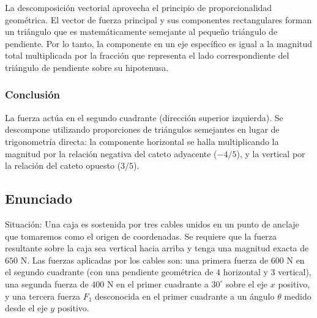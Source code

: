 \documentclass[12pt, a4paper]{article}
\begin{document}
La descomposición vectorial aprovecha el principio de proporcionalidad geométrica. El vector de fuerza principal y sus componentes rectangulares forman un triángulo que es matemáticamente semejante al pequeño triángulo de pendiente. Por lo tanto, la componente en un eje específico es igual a la magnitud total multiplicada por la fracción que representa el lado correspondiente del triángulo de pendiente sobre su hipotenusa.

\subsubsection*{Conclusión}
La fuerza actúa en el segundo cuadrante (dirección superior izquierda). Se descompone utilizando proporciones de triángulos semejantes en lugar de trigonometría directa: la componente horizontal se halla multiplicando la magnitud por la relación negativa del cateto adyacente ($-4/5$), y la vertical por la relación del cateto opuesto ($3/5$).

\newpage
\subsection*{Enunciado}
Situación: Una caja es sostenida por tres cables unidos en un punto de anclaje que tomaremos como el origen de coordenadas. Se requiere que la fuerza resultante sobre la caja sea vertical hacia arriba y tenga una magnitud exacta de $650 \text{ N}$. Las fuerzas aplicadas por los cables son: una primera fuerza de $600 \text{ N}$ en el segundo cuadrante (con una pendiente geométrica de $4$ horizontal y $3$ vertical), una segunda fuerza de $400 \text{ N}$ en el primer cuadrante a $30^\circ$ sobre el eje $x$ positivo, y una tercera fuerza $F_1$ desconocida en el primer cuadrante a un ángulo $\theta$ medido desde el eje $y$ positivo.

\begin{center}
\end{center}
\end{document}
